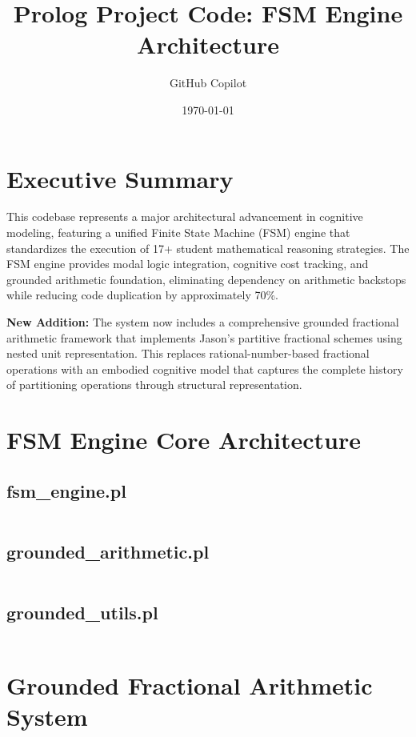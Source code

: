 \documentclass{article}
\title{Prolog Project Code: FSM Engine Architecture}
\author{GitHub Copilot}
\date{\today}
\begin{document}
\maketitle

\section*{Executive Summary}
This codebase represents a major architectural advancement in cognitive modeling, featuring a unified Finite State Machine (FSM) engine that standardizes the execution of 17+ student mathematical reasoning strategies. The FSM engine provides modal logic integration, cognitive cost tracking, and grounded arithmetic foundation, eliminating dependency on arithmetic backstops while reducing code duplication by approximately 70\%.

\textbf{New Addition:} The system now includes a comprehensive grounded fractional arithmetic framework that implements Jason's partitive fractional schemes using nested unit representation. This replaces rational-number-based fractional operations with an embodied cognitive model that captures the complete history of partitioning operations through structural representation.

\tableofcontents
\newpage

\section{FSM Engine Core Architecture}
\subsection{fsm\_engine.pl}
\inputminted{prolog}{fsm_engine.pl}
\subsection{grounded\_arithmetic.pl}
\inputminted{prolog}{grounded_arithmetic.pl}
\subsection{grounded\_utils.pl}
\inputminted{prolog}{grounded_utils.pl}

\section{Grounded Fractional Arithmetic System}
\end{document}
